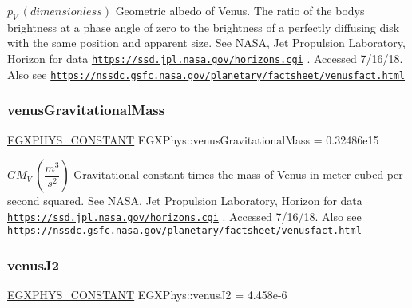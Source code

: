 $ p_{V} \ (dimensionless)$ Geometric albedo of Venus. The ratio of the body\textquotesingle{}s brightness at a phase angle of zero to the brightness of a perfectly diffusing disk with the same position and apparent size. See N\+A\+SA, Jet Propulsion Laboratory, Horizon for data \href{https://ssd.jpl.nasa.gov/horizons.cgi}{\tt https\+://ssd.\+jpl.\+nasa.\+gov/horizons.\+cgi} . Accessed 7/16/18. Also see \href{https://nssdc.gsfc.nasa.gov/planetary/factsheet/venusfact.html}{\tt https\+://nssdc.\+gsfc.\+nasa.\+gov/planetary/factsheet/venusfact.\+html} \mbox{\label{group___e_g_x_phys-_constants-_astrophysics-_solar_system-_venus-_bulk_gaf4348210e0c152323f7df1ca69ffb599}} 
\subsubsection{\texorpdfstring{venus\+Gravitational\+Mass}{venusGravitationalMass}}
{\footnotesize\ttfamily \mbox{\hyperlink{group___e_g_x_phys-_constants-_macros_ga76980d288494ce1714c9ac68a95ba702}{E\+G\+X\+P\+H\+Y\+S\+\_\+\+C\+O\+N\+S\+T\+A\+NT}} E\+G\+X\+Phys\+::venus\+Gravitational\+Mass = 0.\+32486e15}

$ GM_{V} \ (\dfrac{m^3}{s^2})$ Gravitational constant times the mass of Venus in meter cubed per second squared. See N\+A\+SA, Jet Propulsion Laboratory, Horizon for data \href{https://ssd.jpl.nasa.gov/horizons.cgi}{\tt https\+://ssd.\+jpl.\+nasa.\+gov/horizons.\+cgi} . Accessed 7/16/18. Also see \href{https://nssdc.gsfc.nasa.gov/planetary/factsheet/venusfact.html}{\tt https\+://nssdc.\+gsfc.\+nasa.\+gov/planetary/factsheet/venusfact.\+html} \mbox{\label{group___e_g_x_phys-_constants-_astrophysics-_solar_system-_venus-_bulk_ga7cb8b494f46eb7bdf8bbe4a4d61bb53e}} 
\subsubsection{\texorpdfstring{venus\+J2}{venusJ2}}
{\footnotesize\ttfamily \mbox{\hyperlink{group___e_g_x_phys-_constants-_macros_ga76980d288494ce1714c9ac68a95ba702}{E\+G\+X\+P\+H\+Y\+S\+\_\+\+C\+O\+N\+S\+T\+A\+NT}} E\+G\+X\+Phys\+::venus\+J2 = 4.\+458e-\/6}

